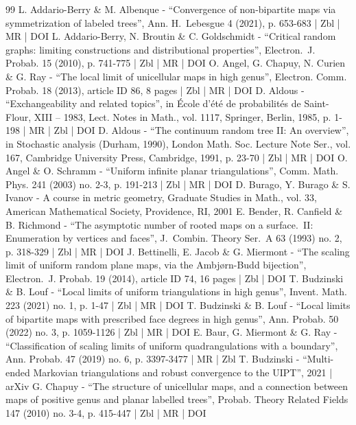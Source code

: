 \documentclass[10pt]{amsart}
\theoremstyle{plain}
\theoremstyle{definition}
\theoremstyle{remark}
\begin{document}
\begin{thebibliography}{99}
L. Addario-Berry \& M. Albenque - “Convergence of non-bipartite maps via symmetrization of labeled trees”, Ann. H. Lebesgue 4 (2021), p. 653-683 | Zbl | MR | DOI
L. Addario-Berry, N. Broutin \& C. Goldschmidt - “Critical random graphs: limiting constructions and distributional properties”, Electron. J. Probab. 15 (2010), p. 741-775 | Zbl | MR | DOI
O. Angel, G. Chapuy, N. Curien \& G. Ray - “The local limit of unicellular maps in high genus”, Electron. Comm. Probab. 18 (2013), article ID 86, 8 pages | Zbl | MR | DOI
D. Aldous - “Exchangeability and related topics”, in École d’été de probabilités de Saint-Flour, XIII – 1983, Lect. Notes in Math., vol. 1117, Springer, Berlin, 1985, p. 1-198 | MR | Zbl | DOI
D. Aldous - “The continuum random tree II: An overview”, in Stochastic analysis (Durham, 1990), London Math. Soc. Lecture Note Ser., vol. 167, Cambridge University Press, Cambridge, 1991, p. 23-70 | Zbl | MR | DOI
O. Angel \& O. Schramm - “Uniform infinite planar triangulations”, Comm. Math. Phys. 241 (2003) no. 2-3, p. 191-213 | Zbl | MR | DOI
D. Burago, Y. Burago \& S. Ivanov - A course in metric geometry, Graduate Studies in Math., vol. 33, American Mathematical Society, Providence, RI, 2001
E. Bender, R. Canfield \& B. Richmond - “The asymptotic number of rooted maps on a surface. II: Enumeration by vertices and faces”, J. Combin. Theory Ser. A 63 (1993) no. 2, p. 318-329 | Zbl | MR | DOI
J. Bettinelli, E. Jacob \& G. Miermont - “The scaling limit of uniform random plane maps, via the Ambjørn-Budd bijection”, Electron. J. Probab. 19 (2014), article ID 74, 16 pages | Zbl | DOI
T. Budzinski \& B. Louf - “Local limits of uniform triangulations in high genus”, Invent. Math. 223 (2021) no. 1, p. 1-47 | Zbl | MR | DOI
T. Budzinski \& B. Louf - “Local limits of bipartite maps with prescribed face degrees in high genus”, Ann. Probab. 50 (2022) no. 3, p. 1059-1126 | Zbl | MR | DOI
E. Baur, G. Miermont \& G. Ray - “Classification of scaling limits of uniform quadrangulations with a boundary”, Ann. Probab. 47 (2019) no. 6, p. 3397-3477 | MR | Zbl
T. Budzinski - “Multi-ended Markovian triangulations and robust convergence to the UIPT”, 2021 | arXiv
G. Chapuy - “The structure of unicellular maps, and a connection between maps of positive genus and planar labelled trees”, Probab. Theory Related Fields 147 (2010) no. 3-4, p. 415-447 | Zbl | MR | DOI

\end{thebibliography}
\end{document}
